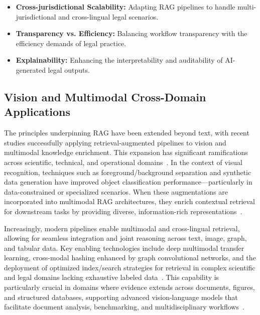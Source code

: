 \documentclass[sigconf]{acmart}
\begin{document}
\begin{itemize}
    \item \textbf{Cross-jurisdictional Scalability:} Adapting RAG pipelines to handle multi-jurisdictional and cross-lingual legal scenarios.
    \item \textbf{Transparency vs. Efficiency:} Balancing workflow transparency with the efficiency demands of legal practice.
    \item \textbf{Explainability:} Enhancing the interpretability and auditability of AI-generated legal outputs.
\end{itemize}

\subsection{Vision and Multimodal Cross-Domain Applications}

The principles underpinning RAG have been extended beyond text, with recent studies successfully applying retrieval-augmented pipelines to vision and multimodal knowledge enrichment. This expansion has significant ramifications across scientific, technical, and operational domains~\cite{ref3,ref5,ref14,ref15,ref20,ref21,ref23,ref24,ref28,ref29,ref30,ref31,ref33,ref36,ref37,ref38,ref39,ref40,ref43,ref45,ref48,ref52,ref54,ref55,ref61,ref62}. In the context of visual recognition, techniques such as foreground/background separation and synthetic data generation have improved object classification performance—particularly in data-constrained or specialized scenarios. When these augmentations are incorporated into multimodal RAG architectures, they enrich contextual retrieval for downstream tasks by providing diverse, information-rich representations~\cite{ref62}.

Increasingly, modern pipelines enable multimodal and cross-lingual retrieval, allowing for seamless integration and joint reasoning across text, image, graph, and tabular data. Key enabling technologies include deep multimodal transfer learning, cross-modal hashing enhanced by graph convolutional networks, and the deployment of optimized index/search strategies for retrieval in complex scientific and legal domains lacking exhaustive labeled data~\cite{ref14,ref15,ref61,ref62}. This capability is particularly crucial in domains where evidence extends across documents, figures, and structured databases, supporting advanced vision-language models that facilitate document analysis, benchmarking, and multidisciplinary workflows~\cite{ref5,ref14,ref28,ref33,ref36,ref37,ref38,ref39,ref40,ref43,ref45,ref54,ref55}.
\end{document}
